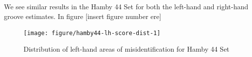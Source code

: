 \documentclass[12pt]{article}\usepackage[]{graphicx}\usepackage[]{color}
\newenvironment{knitrout}{}{} %
\theoremstyle{nonumberplain}
\begin{document}
We see similar results in the Hamby 44 Set for both the left-hand and right-hand groove estimates. In figure [insert figure number ere] 

\begin{knitrout}
\color{fgcolor}\begin{figure}[H]

{\centering \texttt{[image: figure/hamby44-lh-score-dist-1]} 

}

\caption[Distribution of left-hand areas of misidentification for Hamby 44 Set]{Distribution of left-hand areas of misidentification for Hamby 44 Set}\label{fig:hamby44-lh-score-dist}
\end{figure}


\end{knitrout}

 
\end{document}
